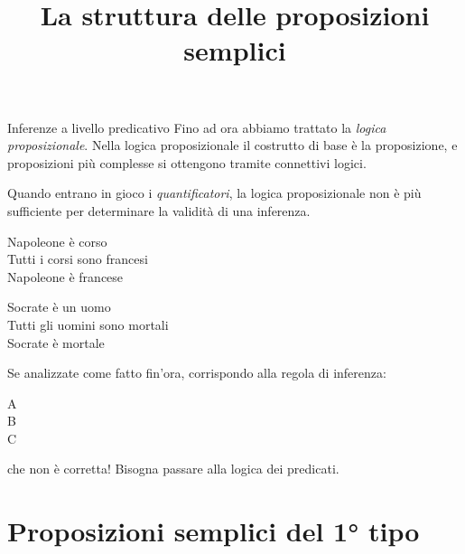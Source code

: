\documentclass[aspectratio=169,10pt,dvipsnames]{beamer}
\title{La struttura delle proposizioni semplici}
\begin{document}
\begin{frame}
\titlepage
\end{frame}

\begin{frame}{Inferenze a livello predicativo}
    Fino ad ora abbiamo trattato la \emph{logica proposizionale}. Nella logica proposizionale il costrutto di base è la proposizione, e proposizioni più complesse si ottengono tramite connettivi logici.

    \medskip
    Quando entrano in gioco i \emph{quantificatori}, la logica proposizionale non è più sufficiente per determinare la validità di una inferenza.

    \begin{center}
        \begin{inference}
            Napoleone è corso\\
            Tutti i corsi sono francesi\\
            \hline
            Napoleone è francese
        \end{inference}
        \qquad
        \begin{inference}
            Socrate è un uomo\\
            Tutti gli uomini sono mortali\\
            \hline
            Socrate è mortale
        \end{inference}
    \end{center}
    Se analizzate come fatto fin'ora, corrispondo alla regola di inferenza:
    \begin{center}
        \begin{inference}
            A\\
            B\\
            \hline
            C
        \end{inference}
    \end{center}
    che non è corretta! Bisogna passare alla \alert{logica dei predicati}.
\end{frame}

\section{Proposizioni semplici del 1° tipo}
\end{document}
